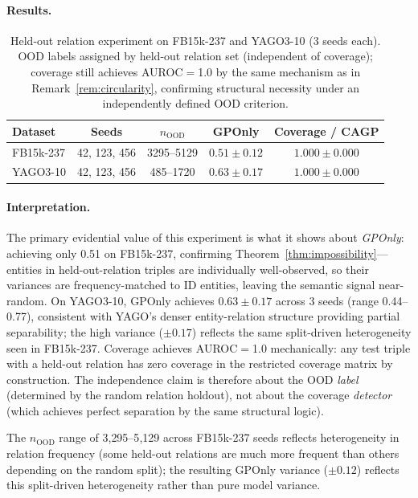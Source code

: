 \documentclass{article}
\begin{document}
\paragraph{Results.}

\begin{table}[ht]
\centering
\caption{Held-out relation experiment on FB15k-237 and YAGO3-10 (3 seeds each). OOD labels assigned by held-out relation set (independent of coverage); coverage still achieves AUROC$=$1.0 by the same mechanism as in Remark~\ref{rem:circularity}, confirming structural necessity under an independently defined OOD criterion.}
\label{tab:held_out}
\begin{tabular}{lcccc}
\toprule
Dataset & Seeds & $n_{\text{OOD}}$ & GPOnly & Coverage / CAGP \\
\midrule
FB15k-237 & 42, 123, 456 & 3295--5129 & $0.51 \pm 0.12$ & $1.000 \pm 0.000$ \\
YAGO3-10  & 42, 123, 456 & 485--1720  & $0.63 \pm 0.17$ & $1.000 \pm 0.000$ \\
\bottomrule
\end{tabular}
\end{table}

\paragraph{Interpretation.}
The primary evidential value of this experiment is what it shows about \emph{GPOnly}: achieving only 0.51 on FB15k-237, confirming Theorem~\ref{thm:impossibility}---entities in held-out-relation triples are individually well-observed, so their variances are frequency-matched to ID entities, leaving the semantic signal near-random.
On YAGO3-10, GPOnly achieves $0.63 \pm 0.17$ across 3 seeds (range 0.44--0.77), consistent with YAGO's denser entity-relation structure providing partial separability; the high variance (${\pm}0.17$) reflects the same split-driven heterogeneity seen in FB15k-237.
Coverage achieves AUROC$=$1.0 mechanically: any test triple with a held-out relation has zero coverage in the restricted coverage matrix by construction. The independence claim is therefore about the OOD \emph{label} (determined by the random relation holdout), not about the coverage \emph{detector} (which achieves perfect separation by the same structural logic).

The $n_{\text{OOD}}$ range of 3{,}295--5{,}129 across FB15k-237 seeds reflects heterogeneity in relation frequency (some held-out relations are much more frequent than others depending on the random split); the resulting GPOnly variance (${\pm}0.12$) reflects this split-driven heterogeneity rather than pure model variance.
\end{document}
